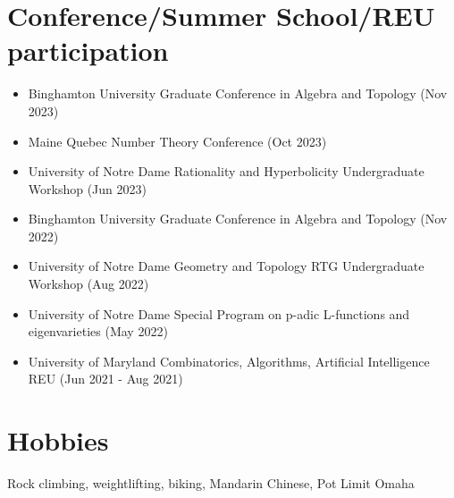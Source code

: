 \documentclass[12pt]{article}
\begin{document}
\section{Conference/Summer School/REU participation}
\begin{itemize}
    \itemsep=-.3em
    \small
    \item Binghamton University Graduate Conference in Algebra and Topology (Nov 2023)
    \item Maine Quebec Number Theory Conference (Oct 2023)
    \item University of Notre Dame Rationality and Hyperbolicity Undergraduate Workshop (Jun 2023)
    \item Binghamton University Graduate Conference in Algebra and Topology (Nov 2022)
    \item University of Notre Dame Geometry and Topology RTG Undergraduate Workshop (Aug 2022)
    \item University of Notre Dame Special Program on p-adic L-functions and eigenvarieties (May 2022)
    \item University of Maryland Combinatorics, Algorithms, Artificial Intelligence REU (Jun 2021 - Aug 2021)
\end{itemize}

\section{Hobbies}
Rock climbing, weightlifting, biking, Mandarin Chinese, Pot Limit Omaha
\end{document}
